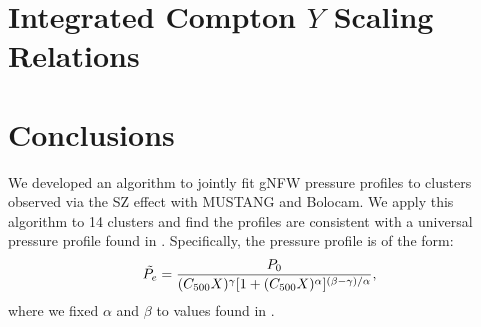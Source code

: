\documentclass[iop,numberedappendix,apj]{emulateapj}
\begin{document}
{%


\section{Integrated Compton $Y$ Scaling Relations}




\section{Conclusions}
\label{sec:conclusions}

We developed an algorithm to jointly fit gNFW pressure profiles to clusters observed via the SZ
effect with MUSTANG and Bolocam. We apply this algorithm to 14 clusters and find the profiles are 
consistent with a universal pressure profile found in \citet{arnaud2010}. Specifically, the 
pressure profile is of the form:
\begin{equation*}
  \Tilde{P_e} = \frac{P_0}{(C_{500} X)^{\gamma} [1 + (C_{500} X)^{\alpha}]^{(\beta - \gamma)/\alpha}},
\end{equation*}
where we fixed $\alpha$ and $\beta$ to values found in \citet{arnaud2010}. 

}
\end{document}
